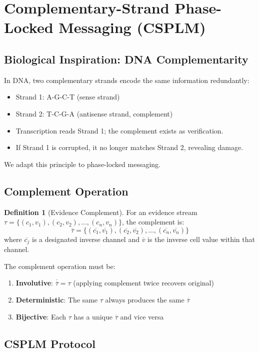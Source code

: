 \documentclass[11pt,a4paper]{article}
\theoremstyle{definition}
\newtheorem{definition}{Definition}[section]
\newcommand{\comp}[1]{\overline{#1}}
\begin{document}
\section{Complementary-Strand Phase-Locked Messaging (CSPLM)}
\label{sec:csplm}

\subsection{Biological Inspiration: DNA Complementarity}

In DNA, two complementary strands encode the same information redundantly:
\begin{itemize}
\item Strand 1: A-G-C-T (sense strand)
\item Strand 2: T-C-G-A (antisense strand, complement)
\item Transcription reads Strand 1; the complement exists as verification.
\item If Strand 1 is corrupted, it no longer matches Strand 2, revealing damage.
\end{itemize}

We adapt this principle to phase-locked messaging.

\subsection{Complement Operation}

\begin{definition}[Evidence Complement]
For an evidence stream $\tau = \{(c_1, v_1), (c_2, v_2), \ldots, (c_n, v_n)\}$, the complement is:
\[
\comp{\tau} = \{(\comp{c_1}, \comp{v_1}), (\comp{c_2}, \comp{v_2}), \ldots, (\comp{c_n}, \comp{v_n})\}
\]
where $\comp{c_j}$ is a designated inverse channel and $\comp{v}$ is the inverse cell value within that channel.

The complement operation must be:
\begin{enumerate}
\item \textbf{Involutive}: $\comp{\comp{\tau}} = \tau$ (applying complement twice recovers original)
\item \textbf{Deterministic}: The same $\tau$ always produces the same $\comp{\tau}$
\item \textbf{Bijective}: Each $\tau$ has a unique $\comp{\tau}$ and vice versa
\end{enumerate}
\end{definition}

\subsection{CSPLM Protocol}
\end{document}

